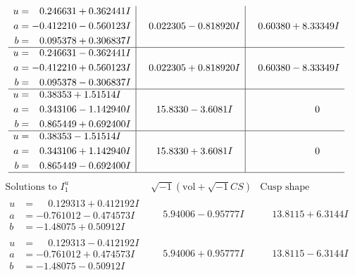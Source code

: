\documentclass[1p]{elsarticle_modified}
\theoremstyle{definition}
\newcommand{\I}{\sqrt{-1}}
\begin{document}
$$\begin{array}{c|c|c}
\begin{aligned}
u &= \phantom{-}0.246631 + 0.362441 I \\
a &= -0.412210 - 0.560123 I \\
b &= \phantom{-}0.095378 + 0.306837 I\end{aligned}
 & \phantom{-}0.022305 - 0.818920 I & \phantom{-}0.60380 + 8.33349 I \\ \hline\begin{aligned}
u &= \phantom{-}0.246631 - 0.362441 I \\
a &= -0.412210 + 0.560123 I \\
b &= \phantom{-}0.095378 - 0.306837 I\end{aligned}
 & \phantom{-}0.022305 + 0.818920 I & \phantom{-}0.60380 - 8.33349 I \\ \hline\begin{aligned}
u &= \phantom{-}0.38353 + 1.51514 I \\
a &= \phantom{-}0.343106 - 1.142940 I \\
b &= \phantom{-}0.865449 + 0.692400 I\end{aligned}
 & \phantom{-}15.8330 - 3.6081 I & \phantom{-0.000000 } 0 \\ \hline\begin{aligned}
u &= \phantom{-}0.38353 - 1.51514 I \\
a &= \phantom{-}0.343106 + 1.142940 I \\
b &= \phantom{-}0.865449 - 0.692400 I\end{aligned}
 & \phantom{-}15.8330 + 3.6081 I & \phantom{-0.000000 } 0\\
 \hline 
 \end{array}$$\newpage$$\begin{array}{c|c|c}  
\text{Solutions to }I^u_{1}& \I (\text{vol} + \sqrt{-1}CS) & \text{Cusp shape}\\
 \hline 
\begin{aligned}
u &= \phantom{-}0.129313 + 0.412192 I \\
a &= -0.761012 - 0.474573 I \\
b &= -1.48075 + 0.50912 I\end{aligned}
 & \phantom{-}5.94006 - 0.95777 I & \phantom{-}13.8115 + 6.3144 I \\ \hline\begin{aligned}
u &= \phantom{-}0.129313 - 0.412192 I \\
a &= -0.761012 + 0.474573 I \\
b &= -1.48075 - 0.50912 I\end{aligned}
 & \phantom{-}5.94006 + 0.95777 I & \phantom{-}13.8115 - 6.3144 I \\ \hline\begin{aligned}

\end{aligned}
\end{array}$$
\end{document}

